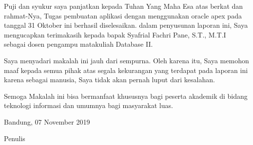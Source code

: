 \begin{acknowledgements}
Puji dan syukur saya panjatkan kepada Tuhan Yang Maha Esa atas berkat dan rahmat-Nya, Tugas pembuatan aplikasi dengan menggunakan oracle apex pada tanggal 31 Oktober ini berhasil diselesaikan. dalam penyusunan laporan ini, Saya mengucapkan terimakasih kepada bapak Syafrial Fachri Pane, S.T., M.T.I sebagai dosen pengampu matakuliah Database II.

Saya menyadari makalah ini jauh dari sempurna. Oleh karena itu, Saya memohon maaf kepada semua pihak atas segala kekurangan yang terdapat pada laporan ini karena sebagai manusia, Saya tidak akan pernah luput dari kesalahan. 

Semoga Makalah ini bisa bermanfaat khususnya bagi peserta akademik di bidang teknologi informasi dan umumnya bagi masyarakat luas. 

\begin{raggedleft}

Bandung, 07 November 2019

Penulis

\end{raggedleft}

\end{acknowledgements}